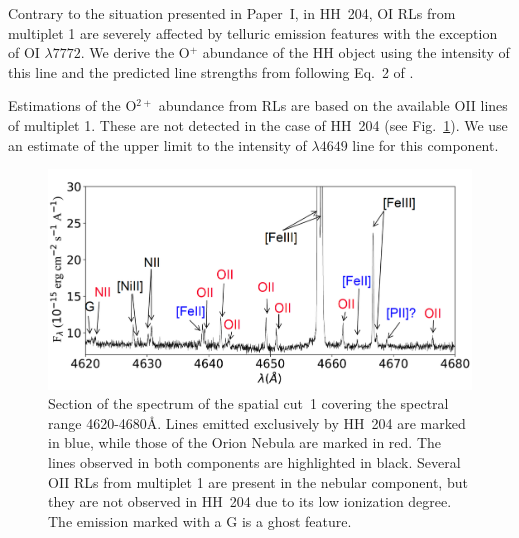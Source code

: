 \documentclass[twocolumn,linenumbers]{aastex63}
\begin{document}
Contrary to the situation presented in Paper~I, in HH~204,  O\thinspace I RLs from multiplet 1 are severely affected by telluric emission features with the exception of O\thinspace I $\lambda 7772$. We derive the O$^{+}$ abundance of the HH object using the intensity of this line and the predicted line strengths from \citet{Wiese96} following Eq.~2 of \citet{Esteban98}.

Estimations of the O$^{2+}$ abundance from RLs are based on the available  O\thinspace II lines of multiplet 1. These are not detected in the case of HH~204 (see Fig.~\ref{fig:range_of_rls}). We use an estimate of the upper limit to the intensity of $\lambda 4649$ line for this component.

\begin{figure}
\centering
\includegraphics[width=\columnwidth]{range_of_rls.pdf}
\caption{Section of the spectrum of the spatial cut~1 covering the spectral range 4620-4680\AA. Lines emitted exclusively by HH~204 are marked in blue, while those of the Orion Nebula are marked in red. The lines observed in both components are highlighted in black. Several O\thinspace II RLs from multiplet 1 are present in the nebular component, but they are not observed in HH~204 due to its low ionization degree. The emission marked with a G is a ghost feature.}
\label{fig:range_of_rls}
\end{figure}
\end{document}
